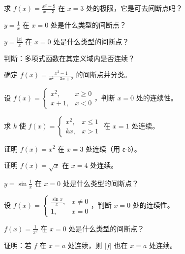 \begin{exercise}[1]
求 \(f(x)=\frac{x^2-9}{x-3}\) 在 \(x=3\) 处的极限，它是可去间断点吗？
\end{exercise}
\begin{exercise}[1]
\(y=\frac{1}{x}\) 在 \(x=0\) 处是什么类型的间断点？
\end{exercise}
\begin{exercise}[1]
\(y=\frac{|x|}{x}\) 在 \(x=0\) 处是什么类型的间断点？
\end{exercise}
\begin{exercise}[1]
判断：多项式函数在其定义域内是否连续？
\end{exercise}

\begin{exercise}[2]
确定 \(f(x)=\frac{x^2-1}{x^2-3x+2}\) 的间断点并分类。
\end{exercise}
\begin{exercise}[2]
设 \(f(x)=\begin{cases}x^2,&x\ge0\\x+1,&x<0\end{cases}\)，判断 \(x=0\) 处的连续性。
\end{exercise}
\begin{exercise}[2]
求 \(k\) 使 \(f(x)=\begin{cases}x^2,&x\le1\\kx,&x>1\end{cases}\) 在 \(x=1\) 处连续。
\end{exercise}
\begin{exercise}[2]
证明 \(f(x)=x^2\) 在 \(x=3\) 处连续（用 ε-δ）。
\end{exercise}

\begin{exercise}[3]
证明 \(f(x)=\sqrt{x}\) 在 \(x=4\) 处连续。
\end{exercise}
\begin{exercise}[3]
\(y=\sin\frac{1}{x}\) 在 \(x=0\) 处是什么类型的间断点？
\end{exercise}
\begin{exercise}[3]
设 \(f(x)=\begin{cases}\frac{\sin x}{x},&x\neq0\\1,&x=0\end{cases}\)，判断 \(x=0\) 处的连续性。
\end{exercise}
\begin{exercise}[3]
\(f(x)=\frac{1}{x^2}\) 在 \(x=0\) 处是什么类型的间断点？
\end{exercise}
\begin{exercise}[3]
证明：若 \(f\) 在 \(x=a\) 处连续，则 \(|f|\) 也在 \(x=a\) 处连续。
\end{exercise}

